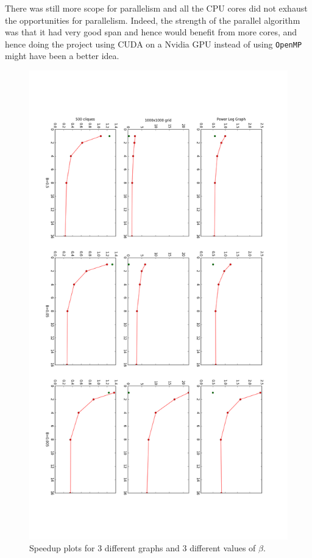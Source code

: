 \documentclass[11pt]{scrartcl}
\theoremstyle{plain}
\theoremstyle{definition}
\theoremstyle{remark}
\begin{document}
There was still more scope for parallelism and all the
CPU cores did not exhaust the opportunities for parallelism.
Indeed, the strength of the parallel algorithm was that
it had very good span and hence would benefit from
more cores, and hence doing the project using CUDA
on a Nvidia GPU instead of using \texttt{OpenMP} might have
been a better idea.
\begin{figure}
\vspace*{-3cm}\includegraphics[width=\textwidth]{Speedup_plots.png}\vspace{-3cm}
\caption{Speedup plots for 3 different graphs and 3 different values of $\beta$.}
\end{figure}
\end{document}
